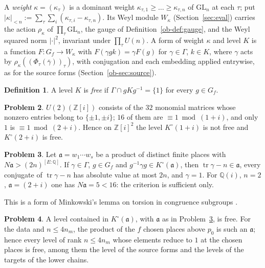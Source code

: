 \documentclass[reqno]{amsart}
\theoremstyle{definition}
\newtheorem{problem}{Problem}[section]
\newtheorem{definition}[problem]{Definition}
\theoremstyle{plain}
\theoremstyle{remark}
\newcommand{\Z}{\mathbb{Z}}
\newcommand{\Q}{\mathbb{Q}}
\newcommand{\tr}{\operatorname{tr}}
\newcommand{\Ko}{K^\circ}
\begin{document}
A \emph{weight} \(\kappa=(\kappa_\tau)\) is a dominant weight \(\kappa_{\tau,1}\ge\dots\ge\kappa_{\tau,n}\) of \(\mathrm{GL}_n\) at each \(\tau\); put \(\lvert\kappa\rvert_{<n}:=\sum_\tau\sum_i(\kappa_{\tau,i}-\kappa_{\tau,n})\).  Its Weyl module \(W_\kappa\) (Section~\ref{sec:eval}) carries the action \(\rho_\kappa\) of \(\prod_\tau\mathrm{GL}_n\), the gauge of Definition~\ref{ob-def:gauge}, and the Weyl squared norm \(\lvert\cdot\rvert^2\), invariant under \(\prod_\tau U(n)\).  A form of weight \(\kappa\) and level \(K\) is a function \(F\colon G_f\to W_\kappa\) with \(F(\gamma gk)=\gamma F(g)\) for \(\gamma\in\Gamma\), \(k\in K\), where \(\gamma\) acts by \(\rho_\kappa((\Phi_\tau(\bar\gamma))_\tau)\), with conjugation and each embedding applied entrywise, as for the source forms (Section~\ref{ob-sec:source}).

\begin{definition}\label{def:free}
A level \(K\) is \emph{free} if \(\Gamma\cap gKg^{-1}=\{1\}\) for every \(g\in G_f\).
\end{definition}

\begin{problem}\label{pr:units}
\(U(2)(\Z[i])\) consists of the \(32\) monomial matrices whose nonzero entries belong to \(\{\pm1,\pm i\}\); \(16\) of them are \(\equiv1\bmod(1+i)\), and only \(1\) is \(\equiv1\bmod(2+i)\).  Hence on \(\Z[i]^2\) the level \(\Ko(1+i)\) is not free and \(\Ko(2+i)\) is free.
\end{problem}

\begin{problem}\label{pr:minkowski}
Let \(\mathfrak a=w_1\cdots w_s\) be a product of distinct finite places with \(N\mathfrak a>(2n)^{[E:\Q]}\).  If \(\gamma\in\Gamma\), \(g\in G_f\) and \(g^{-1}\gamma g\in\Ko(\mathfrak a)\), then \(\tr\gamma-n\in\mathfrak a\), every conjugate of \(\tr\gamma-n\) has absolute value at most \(2n\), and \(\gamma=1\).  For \(\Q(i)\), \(n=2\), \(\mathfrak a=(2+i)\) one has \(N\mathfrak a=5<16\): the criterion is sufficient only.
\end{problem}

This is a form of Minkowski's lemma on torsion in congruence subgroups \cite{Se}.

\begin{problem}\label{pr:free}
A level contained in \(\Ko(\mathfrak a)\), with \(\mathfrak a\) as in Problem~\ref{pr:minkowski}, is free.  For the data and \(n\le4n_m\), the product of the \(f\) chosen places above \(p_0\) is such an \(\mathfrak a\); hence every level of rank \(n\le4n_m\) whose elements reduce to \(1\) at the chosen places is free, among them the level of the source forms and the levels of the targets of the lower chains.
\end{problem}
\end{document}
